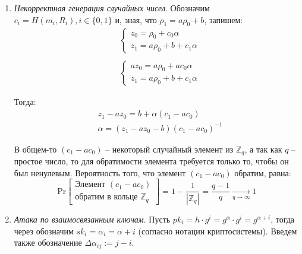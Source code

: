 \documentclass[12pt, a4paper]{extarticle}
\begin{document}
\begin{enumerate}
    \item \textit{Некорректная генерация случайных чисел}. Обозначим $c_i = H(m_i, R_i), i \in \{0, 1\}$ и, зная, что
        $\rho_1 = a \rho_0 + b$, запишем:
        \begin{equation*}
            \begin{split}
                & \left\{\begin{array}{l}
                    z_0 = \rho_0 + c_0 \alpha \\
                    z_1 = a \rho_0 + b + c_1 \alpha
                \end{array}\right. \\ \\
                & \left\{\begin{array}{l}
                    a z_0 = a \rho_0 + a c_0 \alpha \\
                    z_1 = a \rho_0 + b + c_1 \alpha
                \end{array}\right.
            \end{split}
        \end{equation*}
        
        Тогда:
        \begin{equation*}
            \begin{split}
                & z_1 - a z_0 = b + \alpha (c_1 - a c_0) \\
                & \alpha = (z_1 - a z_0 - b)(c_1 - a c_0)^{-1}
            \end{split}
        \end{equation*}
        
        В общем-то $(c_1 - a c_0)$ -- некоторый случайный элемент из $\mathbb{Z}_q$, а так как $q$ -- простое число,
        то для обратимости элемента требуется только то, чтобы он был ненулевым. Вероятность того, что элемент
        $(c_1 - a c_0)$ обратим, равна:
        \begin{equation*}
            \text{Pr}\left[\begin{array}{c}
                \text{Элемент } (c_1 - a c_0) \\
                \text{обратим в кольце } \mathbb{Z}_q
            \end{array}\right] = 1 - \frac{1}{|\mathbb{Z}_q|} = \frac{q - 1}{q} \xrightarrow[q \to \infty]{} 1
        \end{equation*}
        
    \item \textit{Атака по взаимосвязанным ключам}. Пусть $pk_i = h \cdot g^i = g^{\alpha} \cdot g^i = g^{\alpha + i}$,
        тогда через обозначим $sk_i = \alpha_i = \alpha + i$ (согласно нотации криптосистемы). Введем также обозначение 
        $\Delta\alpha_{ij} := j - i$.
        

\end{enumerate}
\end{document}
